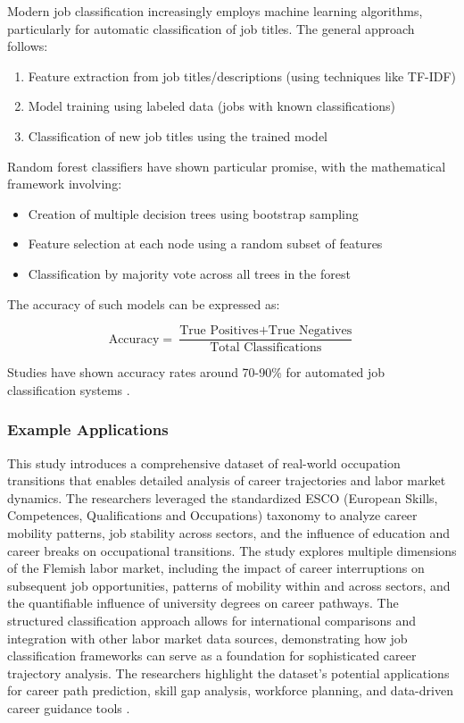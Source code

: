 \documentclass[../main.tex]{subfiles}
\begin{document}
Modern job classification increasingly employs machine learning algorithms, particularly for automatic classification of job titles. The general approach follows:

\begin{enumerate}
\item Feature extraction from job titles/descriptions (using techniques like TF-IDF)
\item Model training using labeled data (jobs with known classifications)
\item Classification of new job titles using the trained model
\end{enumerate}

Random forest classifiers have shown particular promise, with the mathematical framework involving:
\begin{itemize}
\item Creation of multiple decision trees using bootstrap sampling
\item Feature selection at each node using a random subset of features
\item Classification by majority vote across all trees in the forest
\end{itemize}

The accuracy of such models can be expressed as:

\[
\text{Accuracy} = \frac{\text{True Positives} + \text{True Negatives}}{\text{Total Classifications}}
\]

Studies have shown accuracy rates around 70-90\% for automated job classification systems \parencite{ikudo2018,jeesr2021}.

\subsubsection{Example Applications}

This study introduces a comprehensive dataset of real-world occupation transitions that enables detailed analysis of career trajectories and labor market dynamics. The researchers leveraged the standardized ESCO (European Skills, Competences, Qualifications and Occupations) taxonomy to analyze career mobility patterns, job stability across sectors, and the influence of education and career breaks on occupational transitions. The study explores multiple dimensions of the Flemish labor market, including the impact of career interruptions on subsequent job opportunities, patterns of mobility within and across sectors, and the quantifiable influence of university degrees on career pathways. The structured classification approach allows for international comparisons and integration with other labor market data sources, demonstrating how job classification frameworks can serve as a foundation for sophisticated career trajectory analysis. The researchers highlight the dataset's potential applications for career path prediction, skill gap analysis, workforce planning, and data-driven career guidance tools \parencite{jobhop2022}.
\end{document}
